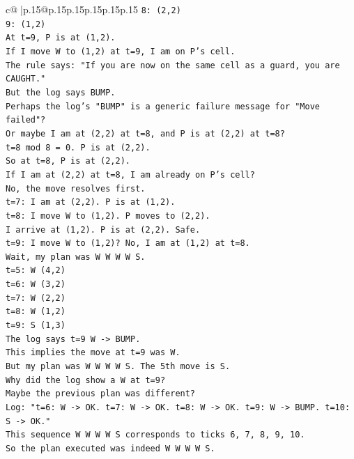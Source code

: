 \documentclass{article}
\begin{document}
{\begin{supertabular}{c@{$\;$}|p{.15\linewidth}@{}p{.15\linewidth}p{.15\linewidth}p{.15\linewidth}p{.15\linewidth}p{.15\linewidth}}
{{{\texttt{8: (2,2)} \\
\texttt{9: (1,2)} \\
\texttt{At t=9, P is at (1,2).} \\
\texttt{If I move W to (1,2) at t=9, I am on P's cell.} \\
\texttt{The rule says: "If you are now on the same cell as a guard, you are CAUGHT."} \\
\texttt{But the log says BUMP.} \\
\texttt{Perhaps the log's "BUMP" is a generic failure message for "Move failed"?} \\
\texttt{Or maybe I am at (2,2) at t=8, and P is at (2,2) at t=8?} \\
\texttt{t=8 mod 8 = 0. P is at (2,2).} \\
\texttt{So at t=8, P is at (2,2).} \\
\texttt{If I am at (2,2) at t=8, I am already on P's cell?} \\
\texttt{No, the move resolves first.} \\
\texttt{t=7: I am at (2,2). P is at (1,2).} \\
\texttt{t=8: I move W to (1,2). P moves to (2,2).} \\
\texttt{I arrive at (1,2). P is at (2,2). Safe.} \\
\texttt{t=9: I move W to (1,2)? No, I am at (1,2) at t=8.} \\
\texttt{Wait, my plan was W W W W S.} \\
\texttt{t=5: W (4,2)} \\
\texttt{t=6: W (3,2)} \\
\texttt{t=7: W (2,2)} \\
\texttt{t=8: W (1,2)} \\
\texttt{t=9: S (1,3)} \\
\texttt{The log says t=9 W {-}> BUMP.} \\
\texttt{This implies the move at t=9 was W.} \\
\texttt{But my plan was W W W W S. The 5th move is S.} \\
\texttt{Why did the log show a W at t=9?} \\
\texttt{Maybe the previous plan was different?} \\
\texttt{Log: "t=6: W {-}> OK. t=7: W {-}> OK. t=8: W {-}> OK. t=9: W {-}> BUMP. t=10: S {-}> OK."} \\
\texttt{This sequence W W W W S corresponds to ticks 6, 7, 8, 9, 10.} \\
\texttt{So the plan executed was indeed W W W W S.} \\
}}}
\end{supertabular}}
\end{document}
